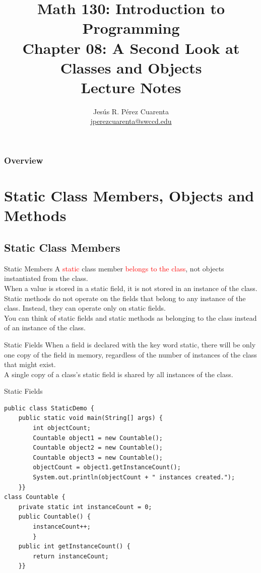 \documentclass[11pt]{beamer}
\title[Chapter 08 Notes]{Math 130: Introduction to Programming \\ Chapter 08: A Second Look at Classes and Objects \\ Lecture Notes}
\author{Jesús R. Pérez Cuarenta \\
\href{mailto:jperezcuarenta@swccd.edu}{jperezcuarenta@swccd.edu}
}
\date{}
\newcommand{\red}[1]{\textcolor{red}{#1}}
\begin{document}
\begin{frame}
  \maketitle
\end{frame}

\begin{frame}
\frametitle{Overview}
    \tableofcontents
\end{frame}

\section{Static Class Members, Objects and Methods}
\subsection{Static Class Members}
\begin{frame}[fragile]{Static Members}
    A \red{static} class member \red{belongs to the class}, not objects instantiated from the class.
    \\ \vspace{1em}
    When a value is stored in a static field, it is not stored in an instance of the class. 
    \\ \vspace{1em}
    Static methods do not operate on the fields that belong to any instance of the class. Instead, they can operate only on static fields.
    \\ \vspace{1em} 
    You can think of static fields and static methods as belonging to the class instead of an instance of the class. 
\end{frame}

\begin{frame}[fragile]{Static Fields}
    When a field is declared with the key word static, there will be only one copy of the field in memory, regardless of the number of instances of the class that might exist.
   \\ \vspace{1em}
    A single copy of a class’s static field is shared by all instances of the class.
\end{frame}

\begin{frame}[fragile]{Static Fields}
    \begin{lstlisting}[basicstyle=\ttfamily\footnotesize]
public class StaticDemo {
	public static void main(String[] args) {
		int objectCount;
		Countable object1 = new Countable();
		Countable object2 = new Countable();
		Countable object3 = new Countable();
		objectCount = object1.getInstanceCount();
		System.out.println(objectCount + " instances created."); 
    }}
class Countable {
	private static int instanceCount = 0;
	public Countable() {
		instanceCount++;
		}
	public int getInstanceCount() {
		return instanceCount;
	}}
    \end{lstlisting}
\end{frame}
\end{document}

